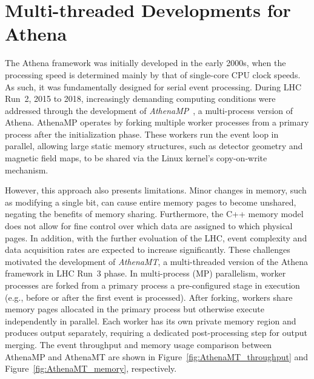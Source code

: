 \section{Multi-threaded Developments for Athena}
The Athena framework was initially developed in the early 2000s, when the processing speed is determined mainly by that of single-core CPU clock speeds. As such, it was fundamentally designed for serial event processing. During LHC Run~2, 2015 to 2018, increasingly demanding computing conditions were addressed through the development of \textit{AthenaMP}~\cite{AthenaMP}, a multi-process version of Athena. AthenaMP operates by forking multiple worker processes from a primary process after the initialization phase. These workers run the event loop in parallel, allowing large static memory structures, such as detector geometry and magnetic field maps, to be shared via the Linux kernel’s copy-on-write mechanism.

However, this approach also presents limitations. Minor changes in memory, such as modifying a single bit, can cause entire memory pages to become unshared, negating the benefits of memory sharing. Furthermore, the C++ memory model does not allow for fine control over which data are assigned to which physical pages. In addition, with the further evoluation of the LHC, event complexity and data acquisition rates are expected to increase significantly. These challenges motivated the development of \textit{AthenaMT}, a multi-threaded version of the Athena framework in LHC Run~3 phase. In multi-process (MP) parallelism, worker processes are forked from a primary process a pre-configured stage in execution (e.g., before or after the first event is processed). After forking, workers share memory pages allocated in the primary process but otherwise execute independently in parallel. Each worker has its own private memory region and produces output separately, requiring a dedicated post-processing step for output merging. The event throughput and memory usage comparison between AthenaMP and AthenaMT are shown in Figure~\ref{fig:AthenaMT_throughput} and Figure~\ref{fig:AthenaMT_memory}, respectively.

